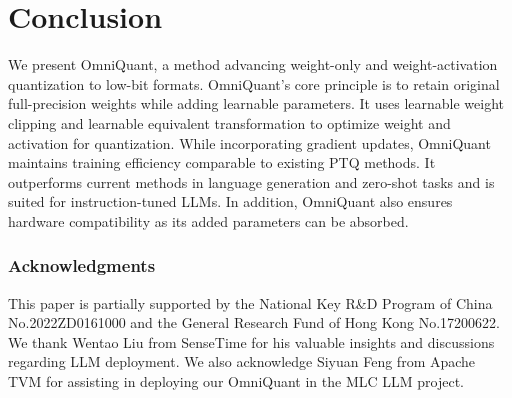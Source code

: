 \documentclass{article} %
\begin{document}
\section{Conclusion}

We present OmniQuant, a method advancing weight-only and weight-activation quantization to low-bit formats. OmniQuant's core principle is to retain original full-precision weights while adding learnable parameters. It uses learnable weight clipping and learnable equivalent transformation to optimize weight and activation for quantization. While incorporating gradient updates, OmniQuant maintains training efficiency comparable to existing PTQ methods. It outperforms current methods in language generation and zero-shot tasks and is suited for instruction-tuned LLMs. In addition, OmniQuant also ensures hardware compatibility as its added parameters can be absorbed.



\subsubsection*{Acknowledgments}
This paper is partially supported by the National Key R\&D Program of China  No.2022ZD0161000 and the General Research Fund of Hong Kong No.17200622. We thank Wentao Liu from SenseTime for his valuable insights and discussions regarding LLM deployment. We also acknowledge Siyuan Feng from Apache TVM for assisting in deploying our OmniQuant in the MLC LLM project.





\appendix
\end{document}
